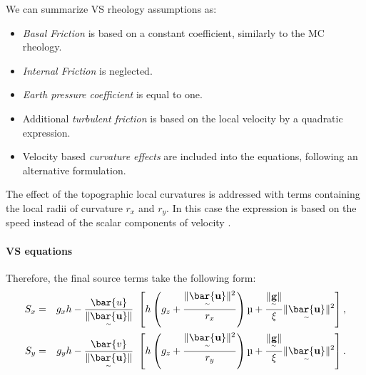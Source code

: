 \documentclass[nhess, manuscript]{copernicus}
\begin{document}
We can summarize VS rheology assumptions as:
\begin{itemize}
\item \textit{Basal Friction} is based on a constant coefficient, similarly to the MC rheology.

\item \textit{Internal Friction} is neglected.

\item \textit{Earth pressure coefficient} is equal to one.

\item Additional \textit{turbulent friction} is based on the local velocity by a quadratic expression.

\item Velocity based \textit{curvature effects} are included into the equations, following an alternative formulation.
\end{itemize}

The effect of the topographic local curvatures is addressed with terms containing the local radii of curvature $r_x$ and $r_y$. In this case the expression is based on the speed instead of the scalar components of velocity \citep{PudasainiHutter2003,Fischer2012}.

\paragraph{VS equations} Therefore, the final source terms take the following form:
\begin{eqnarray}
\label{eq:S_terms_VS}
S_{x} &=&  g_{x} h - \frac{\bar{u}}{\| \underset{^\sim}{\bar{\textbf u}}\|} \ \left[ h \left(g_{z} + \frac{\| \underset{^\sim}{\bar{\textbf u}} \|^2}{r_{x}} \right)\mu+ \frac{\| \underset{^\sim}{\textbf g} \|}{\xi}\| \underset{^\sim}{\bar{\textbf u}} \|^2\right], \nonumber \\
S_{y} &=& g_{y} h - \frac{\bar{v}}{\| \underset{^\sim}{\bar{\textbf u}}\|} \ \left[ h \left(g_{z} + \frac{\| \underset{^\sim}{\bar{\textbf u}} \|^2}{r_{y}} \right)\mu+ \frac{\| \underset{^\sim}{\textbf g} \|}{\xi}\| \underset{^\sim}{\bar{\textbf u}} \|^2\right].
\end{eqnarray}
\end{document}
